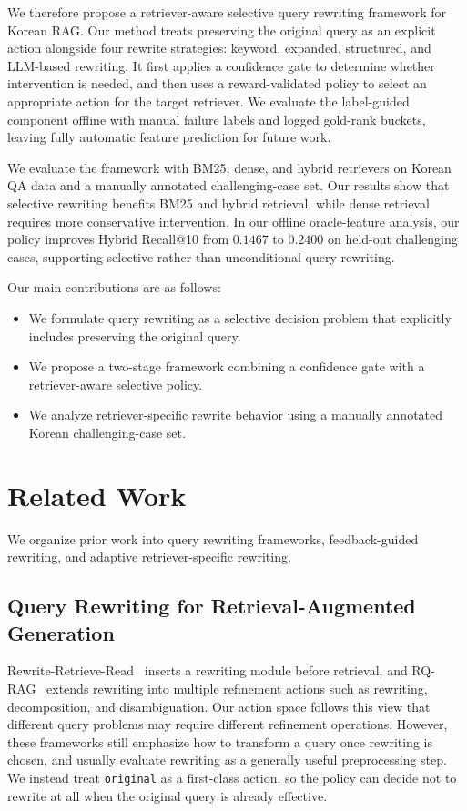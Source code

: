 \documentclass{article}
\begin{document}
We therefore propose a retriever-aware selective query rewriting framework for 
Korean RAG. Our method treats preserving the original query as an explicit action 
alongside four rewrite strategies: keyword, expanded, structured, and LLM-based 
rewriting. It first applies a confidence gate to determine whether intervention is 
needed, and then uses a reward-validated policy to select an appropriate action for 
the target retriever. We evaluate the label-guided component offline with manual
failure labels and logged gold-rank buckets, leaving fully automatic feature
prediction for future work.

We evaluate the framework with BM25, dense, and hybrid retrievers on Korean QA data 
and a manually annotated challenging-case set. Our results show that selective 
rewriting benefits BM25 and hybrid retrieval, while dense retrieval requires more 
conservative intervention. In our offline oracle-feature analysis, our policy improves Hybrid Recall@10 from 
$0.1467$ to $0.2400$ on held-out challenging cases, supporting selective rather than 
unconditional query rewriting.

Our main contributions are as follows:
\begin{itemize}
    \item We formulate query rewriting as a selective decision problem that 
    explicitly includes preserving the original query.
    \item We propose a two-stage framework combining a confidence gate with a 
    retriever-aware selective policy.
    \item We analyze retriever-specific rewrite behavior using a manually annotated 
    Korean challenging-case set.
\end{itemize}

\section{Related Work}

We organize prior work into query rewriting frameworks, feedback-guided
rewriting, and adaptive retriever-specific rewriting.

\subsection{Query Rewriting for Retrieval-Augmented Generation}

Rewrite-Retrieve-Read~\cite{ma2023rewrite} inserts a rewriting module before
retrieval, and RQ-RAG~\cite{chan2024rqrag} extends rewriting into multiple
refinement actions such as rewriting, decomposition, and disambiguation. Our
action space follows this view that different query problems may require
different refinement operations. However, these frameworks still emphasize how
to transform a query once rewriting is chosen, and usually evaluate rewriting as
a generally useful preprocessing step. We instead treat \texttt{original} as a
first-class action, so the policy can decide not to rewrite at all when the
original query is already effective.
\end{document}
